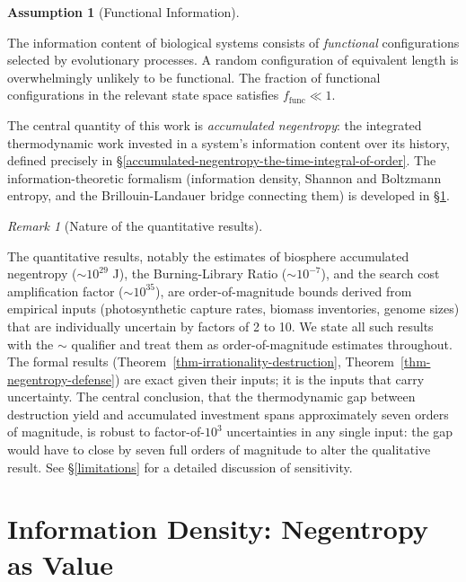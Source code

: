 \documentclass[11pt]{article}
\theoremstyle{plain}
\theoremstyle{definition}
\newtheorem{assumption}[definition]{Assumption}
\theoremstyle{remark}
\newtheorem{remark}{Remark}
\let\origsection\section
\renewcommand{\section}{\needspace{12\baselineskip}\origsection}
\begin{document}
\begin{assumption}[Functional Information]
\label{asm-functional-information}

The information content of biological systems consists of \emph{functional} configurations selected by evolutionary processes. A random configuration of equivalent length is overwhelmingly unlikely to be functional. The fraction of functional configurations in the relevant state space satisfies $f_{\text{func}} \ll 1$.
\end{assumption}

The central quantity of this work is \emph{accumulated negentropy}: the
integrated thermodynamic work invested in a system's information content
over its history, defined precisely in
§\ref{accumulated-negentropy-the-time-integral-of-order}. The
information-theoretic formalism (information density, Shannon and
Boltzmann entropy, and the Brillouin-Landauer bridge connecting them) is
developed in §\ref{information-density-negentropy-as-value}.

\begin{remark}[Nature of the quantitative results]
\label{rem-order-of-magnitude}

The quantitative results, notably the estimates of biosphere accumulated negentropy ($\sim 10^{29}$ J), the Burning-Library Ratio ($\sim 10^{-7}$), and the search cost amplification factor ($\sim 10^{35}$), are order-of-magnitude bounds derived from empirical inputs (photosynthetic capture rates, biomass inventories, genome sizes) that are individually uncertain by factors of 2 to 10. We state all such results with the $\sim$ qualifier and treat them as order-of-magnitude estimates throughout. The formal results (Theorem~\ref{thm-irrationality-destruction}, Theorem~\ref{thm-negentropy-defense}) are exact given their inputs; it is the inputs that carry uncertainty. The central conclusion, that the thermodynamic gap between destruction yield and accumulated investment spans approximately seven orders of magnitude, is robust to factor-of-$10^3$ uncertainties in any single input: the gap would have to close by seven full orders of magnitude to alter the qualitative result. See §\ref{limitations} for a detailed discussion of sensitivity.
\end{remark}

\section{Information Density: Negentropy as
Value}\label{information-density-negentropy-as-value}
\end{document}
